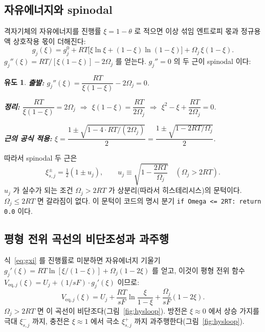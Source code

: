 \documentclass[11pt,a4paper]{article}
\newtheorem*{derivebox}{유도}
\newcommand{\eq}{\mathrm{eq}}
\newcommand{\code}[1]{\texttt{#1}}
\begin{document}
\subsection{자유에너지와 spinodal}
격자기체의 자유에너지를 진행률 $\xi=1-\theta$ 로 적으면 이상 섞임 엔트로피 몫과 정규용액 상호작용 몫이 더해진다:
\begin{equation}
g_j(\xi)=g_j^0+RT\big[\xi\ln\xi+(1-\xi)\ln(1-\xi)\big]+\Omega_j\,\xi(1-\xi).
\label{eq:gxi}
\end{equation}
$g_j''(\xi)=RT/[\xi(1-\xi)]-2\Omega_j$ 를 얻는다. $g_j''=0$ 의 두 근이 spinodal 이다:

\begin{derivebox}
\textbf{출발: } $g_j''(\xi)=\dfrac{RT}{\xi(1-\xi)}-2\Omega_j=0$.

\textbf{정리: } $\dfrac{RT}{\xi(1-\xi)}=2\Omega_j$ $\Longrightarrow$ $\xi(1-\xi)=\dfrac{RT}{2\Omega_j}$ $\Longrightarrow$
$\xi^2-\xi+\dfrac{RT}{2\Omega_j}=0$.

\textbf{근의 공식 적용: } $\xi=\dfrac{1\pm\sqrt{1-4\cdot RT/(2\Omega_j)}}{2}=\dfrac{1\pm\sqrt{1-2RT/\Omega_j}}{2}$.
\end{derivebox}

따라서 spinodal 두 근은
\begin{equation}
\xi_{s,j}^\pm=\tfrac12(1\pm u_j),\qquad
u_j\equiv\sqrt{1-\frac{2RT}{\Omega_j}}\quad(\Omega_j>2RT).
\label{eq:spinodal}
\end{equation}
$u_j$ 가 실수가 되는 조건 $\Omega_j>2RT$ 가 상분리(따라서 히스테리시스)의 문턱이다. $\Omega_j\le2RT$ 면 갈라짐이 없다.
이 문턱이 코드의 명시 분기 \code{if Omega <= 2RT: return 0.0} 이다.

\subsection{평형 전위 곡선의 비단조성과 과주행}
식~\eqref{eq:gxi} 를 진행률로 미분하면 자유에너지 기울기 $g_j'(\xi)=RT\ln[\xi/(1-\xi)]+\Omega_j(1-2\xi)$ 를 얻고,
이것이 평형 전위 함수 $V_{\eq,j}(\xi)=U_j+(1/sF)\cdot g_j'(\xi)$ 이므로:
\begin{equation}
V_{\eq,j}(\xi)=U_j+\frac{RT}{sF}\ln\frac{\xi}{1-\xi}+\frac{\Omega_j}{sF}(1-2\xi).
\label{eq:Veq}
\end{equation}
$\Omega_j>2RT$ 면 이 곡선이 비단조다(그림~\ref{fig:hysloop}). 방전은 $\xi\!\approx\!0$ 에서 상승 가지를 극대
$\xi_{s,j}^-$ 까지, 충전은 $\xi\!\approx\!1$ 에서 극소 $\xi_{s,j}^+$ 까지 과주행한다(그림~\ref{fig:hysloop}).
\end{document}
